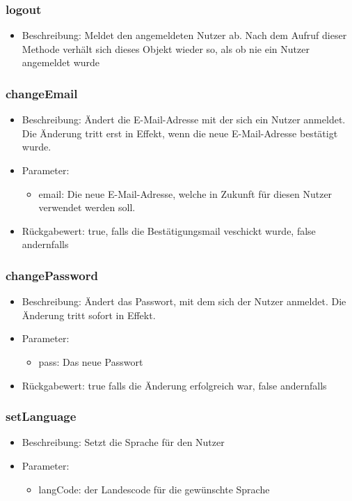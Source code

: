 \documentclass[a4paper]{scrreprt}
\begin{document}
    \subsubsection{logout}
    \begin{itemize}
        \item Beschreibung: Meldet den angemeldeten Nutzer ab. Nach dem Aufruf dieser Methode verhält sich dieses Objekt wieder so, als ob nie ein Nutzer angemeldet wurde
    \end{itemize}
    \subsubsection{changeEmail}
    \begin{itemize}
        \item Beschreibung: Ändert die E-Mail-Adresse mit der sich ein Nutzer anmeldet. Die Änderung tritt erst in Effekt, wenn die neue E-Mail-Adresse bestätigt wurde.
        \item Parameter:
        \begin{itemize}
            \item email: Die neue E-Mail-Adresse, welche in Zukunft für diesen Nutzer verwendet werden soll.
        \end{itemize}
        \item Rückgabewert: true, falls die Bestätigungsmail veschickt wurde, false andernfalls
    \end{itemize}
    \subsubsection{changePassword}
    \begin{itemize}
        \item Beschreibung: Ändert das Passwort, mit dem sich der Nutzer anmeldet. Die Änderung tritt sofort in Effekt.
        \item Parameter:
        \begin{itemize}
            \item pass: Das neue Passwort
        \end{itemize}
        \item Rückgabewert: true falls die Änderung erfolgreich war, false andernfalls
    \end{itemize}
    \subsubsection{setLanguage}
    \begin{itemize}
        \item Beschreibung: Setzt die Sprache für den Nutzer
        \item Parameter:
        \begin{itemize}
            \item langCode: der Landescode für die gewünschte Sprache
        \end{itemize}
    \end{itemize}
\end{document}
